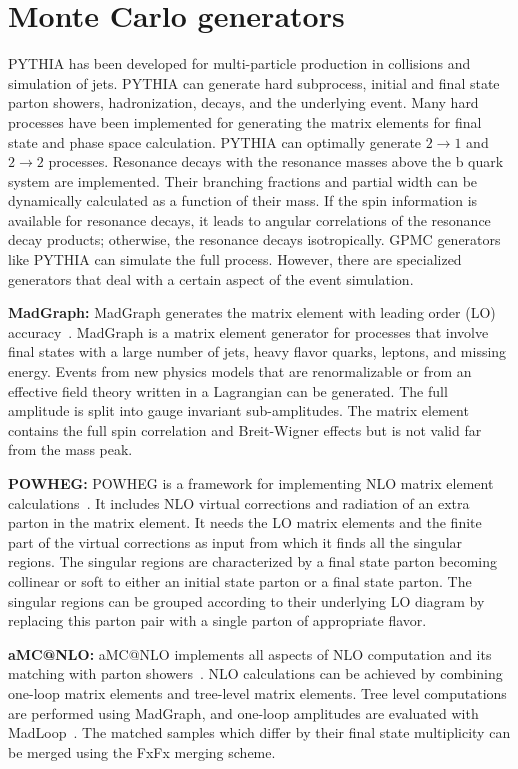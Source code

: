 \section{Monte Carlo generators}

PYTHIA has been developed for multi-particle production in \pp collisions and simulation of jets. PYTHIA can generate hard subprocess, initial and final state parton showers, hadronization, decays, and the underlying event. Many hard processes have been implemented for generating the matrix elements for final state and phase space calculation. PYTHIA can optimally generate $2 \to 1$ and $2 \to 2$ processes. Resonance decays with the resonance masses above the b quark system are implemented. Their branching fractions and partial width can be dynamically calculated as a function of their mass. If the spin information is available for resonance decays, it leads to angular correlations of the resonance decay products; otherwise, the resonance decays isotropically. GPMC generators like PYTHIA can simulate the full process. However, there are specialized generators that deal with a certain aspect of the event simulation.

\textbf{MadGraph:} MadGraph generates the matrix element with leading order (LO) accuracy~\cite{Alwall:2011uj}. MadGraph is a matrix element generator for processes that involve final states with a large number of jets, heavy flavor quarks, leptons, and missing energy. Events from new physics models that are renormalizable or from an effective field theory written in a Lagrangian can be generated. The full amplitude is split into gauge invariant sub-amplitudes. The matrix element contains the full spin correlation and Breit-Wigner effects but is not valid far from the mass peak.

\textbf{POWHEG:} POWHEG is a framework for implementing NLO matrix element calculations~\cite{Alioli:2010xd}. It includes NLO virtual corrections and radiation of an extra parton in the matrix element. It needs the LO matrix elements and the finite part of the virtual corrections as input from which it finds all the singular regions. The singular regions are characterized by a final state parton becoming collinear or soft to either an initial state parton or a final state parton. The singular regions can be grouped according to their underlying LO diagram by replacing this parton pair with a single parton of appropriate flavor.

\textbf{aMC@NLO:} aMC@NLO implements all aspects of NLO computation and its matching with parton showers~\cite{Frederix:2011ss, Alwall:2014hca}. NLO calculations can be achieved by combining one-loop matrix elements and tree-level matrix elements. Tree level computations are performed using MadGraph, and one-loop amplitudes are evaluated with MadLoop~\cite{Hirschi:2011pa}. The matched samples which differ by their final state multiplicity can be merged using the FxFx merging scheme.

